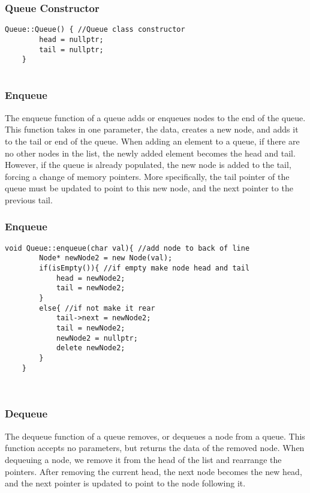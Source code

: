 \documentclass[letterpaper, 10pt,DIV=13]{scrartcl}
\numberwithin{equation}{section} %
\numberwithin{figure}{section} %
\numberwithin{table}{section} %
\begin{document}
\subsubsection*{Queue Constructor}
    \lstset{numbers=left, numberstyle=\tiny, stepnumber=1, numbersep=5pt, basicstyle=\footnotesize\ttfamily}
    \begin{lstlisting}[frame=single, ]
    Queue::Queue() { //Queue class constructor
        head = nullptr;
        tail = nullptr;
    }
    
\end{lstlisting}

\subsubsection{Enqueue}
The enqueue function of a queue adds or enqueues nodes to the end of the queue. This function takes in one parameter, the data, creates a new node, and adds it to the tail or end of the queue. When adding an element to a queue, if there are no other nodes in the list, the newly added element becomes the head and tail. However, if the queue is already populated, the new node is added to the tail, forcing a change of memory pointers. More specifically, the tail pointer of the queue must be updated to point to this new node, and the next pointer to the previous tail.

\subsubsection*{Enqueue}
    \lstset{numbers=left, numberstyle=\tiny, stepnumber=1, numbersep=5pt, basicstyle=\footnotesize\ttfamily}
    \begin{lstlisting}[frame=single, ]
    void Queue::enqueue(char val){ //add node to back of line
        Node* newNode2 = new Node(val);
        if(isEmpty()){ //if empty make node head and tail
            head = newNode2;
            tail = newNode2;
        }
        else{ //if not make it rear
            tail->next = newNode2;
            tail = newNode2;
            newNode2 = nullptr;
            delete newNode2;
        }
    }
    
    
\end{lstlisting}

\subsubsection{Dequeue}
The dequeue function of a queue removes, or dequeues a node from a queue. This function accepts no parameters, but returns the data of the removed node. When dequeuing a node, we remove it from the head of the list and rearrange the pointers. After removing the current head, the next node becomes the new head, and the next pointer is updated to point to the node following it.
\end{document}
